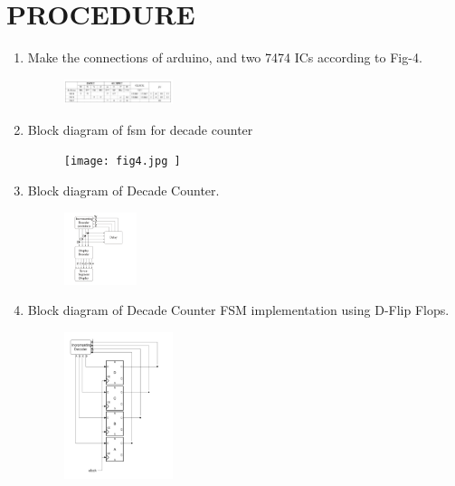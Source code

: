 \documentclass[conference]{IEEEtran}
\begin{document}
\section{PROCEDURE}


\begin{enumerate}

\item Make the connections of arduino, and two 7474 ICs according to Fig-4.
	\begin{figure}[h] 
	\centering 
	\includegraphics[width=0.3\textwidth]{fig3.jpg     }
	\caption{\label{fig-4:Gates}}    
\end{figure}

\item Block diagram of fsm for decade counter
\begin{figure}[h]                           
\centering                                 
\texttt{[image: fig4.jpg  ]}                                           
\caption{\label{fig-5:Gates}}               
\end{figure}



\item Block diagram of Decade Counter.

\begin{figure}[h]                           
\centering                                 
\includegraphics[width=0.2\textwidth]{fig5.jpg}                                           
\caption{\label{fig-5:Gates}}               
\end{figure}





\item Block diagram of Decade Counter FSM implementation using D-Flip Flops.

\begin{figure}[h]                           
\centering                                 
\includegraphics[width=0.3\textwidth]{fig6.jpg }                                           
\caption{\label{fig-5:Gates}}               
\end{figure}


\end{enumerate}
\end{document}

